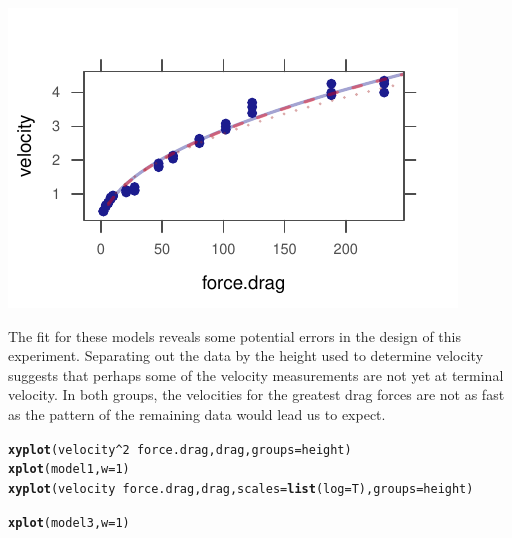 \documentclass[twoside]{book}\usepackage[]{graphicx}\usepackage[]{xcolor}
\makeatletter
\def\maxwidth{ %
  \ifdim\Gin@nat@width>\linewidth
    \linewidth
  \else
    \Gin@nat@width
  \fi
}
\newcommand{\hlnum}[1]{\textcolor[rgb]{0.686,0.059,0.569}{#1}}%
\newcommand{\hlopt}[1]{\textcolor[rgb]{0,0,0}{#1}}%
\newcommand{\hlstd}[1]{\textcolor[rgb]{0.345,0.345,0.345}{#1}}%
\newcommand{\hlkwc}[1]{\textcolor[rgb]{0.333,0.667,0.333}{#1}}%
\newcommand{\hlkwd}[1]{\textcolor[rgb]{0.737,0.353,0.396}{\textbf{#1}}}%
\newenvironment{kframe}{%
 \def\at@end@of@kframe{}%
 \ifinner\ifhmode%
  \def\at@end@of@kframe{\end{minipage}}%
  \begin{minipage}{\columnwidth}%
 \fi\fi%
 \def\FrameCommand##1{\hskip\@totalleftmargin \hskip-\fboxsep
 \colorbox{shadecolor}{##1}\hskip-\fboxsep
     \hskip-\linewidth \hskip-\@totalleftmargin \hskip\columnwidth}%
 \MakeFramed {\advance\hsize-\width
   \@totalleftmargin\z@ \linewidth\hsize
   \@setminipage}}%
 {\par\unskip\endMakeFramed%
 \at@end@of@kframe}
\newenvironment{knitrout}{}{} %
\makeatother
\begin{document}
\begin{solution}
\begin{knitrout}
{\includegraphics[width=\maxwidth]{figures/fig-unnamed-chunk-239-4} 

}



\end{knitrout}

The fit for these models reveals some 
potential errors in the design of this experiment.  Separating out the data
by the height used to determine velocity suggests that perhaps some of the 
velocity measurements are not yet at terminal velocity.
In both groups, the velocities for the greatest drag forces are 
not as fast as the pattern of the remaining data would lead us to expect.

\begin{knitrout}
\color{fgcolor}\begin{kframe}
\begin{alltt}
\hlkwd{xyplot}\hlstd{(velocity}\hlopt{^}\hlnum{2} \hlopt{~} \hlstd{force.drag, drag,} \hlkwc{groups} \hlstd{= height)}
\hlkwd{xplot}\hlstd{(model1,} \hlkwc{w} \hlstd{=} \hlnum{1}\hlstd{)}
\hlkwd{xyplot}\hlstd{(velocity} \hlopt{~} \hlstd{force.drag, drag,} \hlkwc{scales} \hlstd{=} \hlkwd{list}\hlstd{(}\hlkwc{log} \hlstd{= T),} \hlkwc{groups} \hlstd{= height)}
\end{alltt}


{\ttfamily\noindent\bfseries{}}\begin{alltt}
\hlkwd{xplot}\hlstd{(model3,} \hlkwc{w} \hlstd{=} \hlnum{1}\hlstd{)}
\end{alltt}
\end{kframe}


\end{knitrout}
\end{solution}
\end{document}
